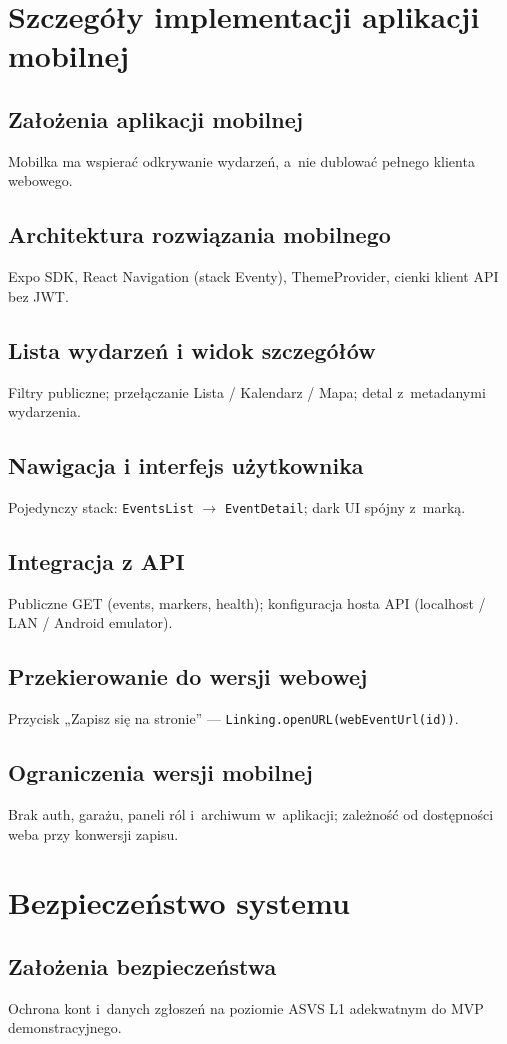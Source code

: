 \documentclass{sprz}
\begin{document}
\chapter{Szczegóły implementacji aplikacji mobilnej}  
\section{Założenia aplikacji mobilnej}  
Mobilka ma wspierać odkrywanie wydarzeń, a~nie dublować pełnego klienta webowego.  
\section{Architektura rozwiązania mobilnego}  
Expo SDK, React Navigation (stack Eventy), ThemeProvider, cienki klient API bez JWT.  
\section{Lista wydarzeń i widok szczegółów}  
Filtry publiczne; przełączanie Lista / Kalendarz / Mapa; detal z~metadanymi wydarzenia.  
\section{Nawigacja i interfejs użytkownika}  
Pojedynczy stack: \texttt{EventsList} $\rightarrow$ \texttt{EventDetail}; dark UI spójny z~marką.  
\section{Integracja z API}  
Publiczne GET (events, markers, health); konfiguracja hosta API (localhost / LAN / Android emulator).  
\section{Przekierowanie do wersji webowej}  
Przycisk „Zapisz się na stronie” --- \texttt{Linking.openURL(webEventUrl(id))}.  
\section{Ograniczenia wersji mobilnej}  
Brak auth, garażu, paneli ról i~archiwum w~aplikacji; zależność od dostępności weba przy konwersji zapisu.  
  
\chapter{Bezpieczeństwo systemu}  
\label{ch:bezpieczenstwo}  
\section{Założenia bezpieczeństwa}  
Ochrona kont i~danych zgłoszeń na poziomie ASVS L1 adekwatnym do MVP demonstracyjnego.  
\end{document}
